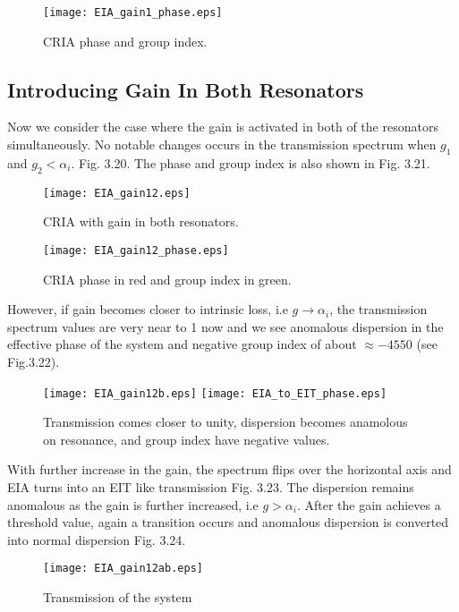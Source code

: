 \begin{figure}[h]
\centering
\texttt{[image: EIA\_gain1\_phase.eps]}
\caption{CRIA phase and group index.}
\end{figure}


\subsection{Introducing Gain In Both Resonators}
Now we consider the case where the gain is activated in both of the resonators simultaneously. No notable changes occurs in the transmission spectrum when $g_{1}$ and $g_{2} < \alpha_{i}$. Fig. 3.20. The phase and group index is also shown in Fig. 3.21.

\begin{figure}[h]
\centering
\texttt{[image: EIA\_gain12.eps]}
\caption{CRIA with gain in both resonators.}
\end{figure}


\begin{figure}[h]
\centering
\texttt{[image: EIA\_gain12\_phase.eps]}
\caption{CRIA phase in red and group index in green.}
\end{figure}

However, if gain becomes closer to intrinsic loss, i.e $g \to \alpha_{i}$, the transmission spectrum values are very near to 1 now and we see anomalous dispersion in the effective phase of the system and negative group index of about $\approx -4550$ (see Fig.3.22).

\begin{figure}[h]
\centering
\texttt{[image: EIA\_gain12b.eps]}
\texttt{[image: EIA\_to\_EIT\_phase.eps]}
\caption{Transmission comes closer to unity, dispersion becomes anamolous on resonance, and group index have negative values.}
\end{figure}

With further increase in the gain, the spectrum flips over the horizontal axis and EIA turns into an EIT like transmission Fig. 3.23. The dispersion remains anomalous as the gain is further increased, i.e $g > \alpha_{i}$. After the gain achieves a threshold value, again a transition occurs and anomalous dispersion is converted into normal dispersion Fig. 3.24.

\begin{figure}[h]
\centering
\texttt{[image: EIA\_gain12ab.eps]}
\caption{Transmission of the system}
\end{figure}


